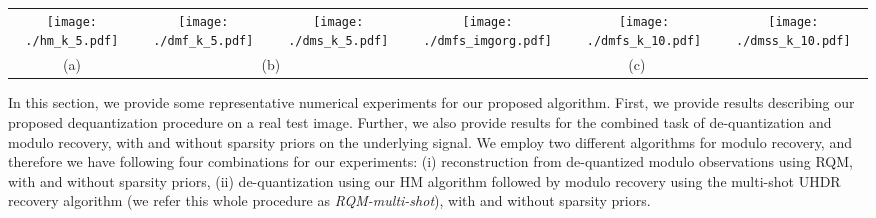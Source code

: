 \begin{figure*}[t]
	\begin{center}
		\begingroup
		\setlength{\tabcolsep}{0.1pt} %
		\begin{tabular}{cccccc}      %

				\texttt{[image: ./hm\_k\_5.pdf]}& \hspace{15pt}
				\texttt{[image: ./dmf\_k\_5.pdf]}&
					\texttt{[image: ./dms\_k\_5.pdf]}& \hspace{15pt}
						\texttt{[image: ./dmfs\_imgorg.pdf]}&
							\texttt{[image: ./dmfs\_k\_10.pdf]}&
								\texttt{[image: ./dmss\_k\_10.pdf]} \\
								
			
		
			 (a) & \multicolumn{2}{c}{\hspace{20pt}(b)} & \multicolumn{3}{c}{\hspace{22pt}(c)}
		\end{tabular}
		\endgroup
	\end{center}
	\caption{\emph{Image reconstruction results: (a) image reconstructed from quantized measurements using HM, $k=5$; (b) image reconstructed from quantized modulo measurements using RQM (left) and RQM multi-shot (right), $k=5$; (c) sparse input image (left), image reconstructed from quantized modulo measurements of sparse input using RQM-sparse (centre) and RQM multi-shot-sparse (right), $k=10$.}}
	\vspace{-0.4em}%
	\label{fig:imgresult}
\end{figure*}
	\vspace{-0.5em}%
In this section, we provide some representative numerical experiments for our proposed algorithm. 
First, we provide results describing our proposed dequantization procedure on a real test image. Further, we also provide results for the combined task of de-quantization and modulo recovery, with and without sparsity priors on the underlying signal. We employ two different algorithms for modulo recovery, and therefore we have following four combinations for our experiments: (i) reconstruction from de-quantized modulo observations using RQM, with and without sparsity priors, (ii) de-quantization using our HM algorithm followed by modulo recovery using the multi-shot UHDR recovery algorithm (we refer this whole procedure as \emph{RQM-multi-shot}), with and without sparsity priors.
	\vspace{-0.7em}%
